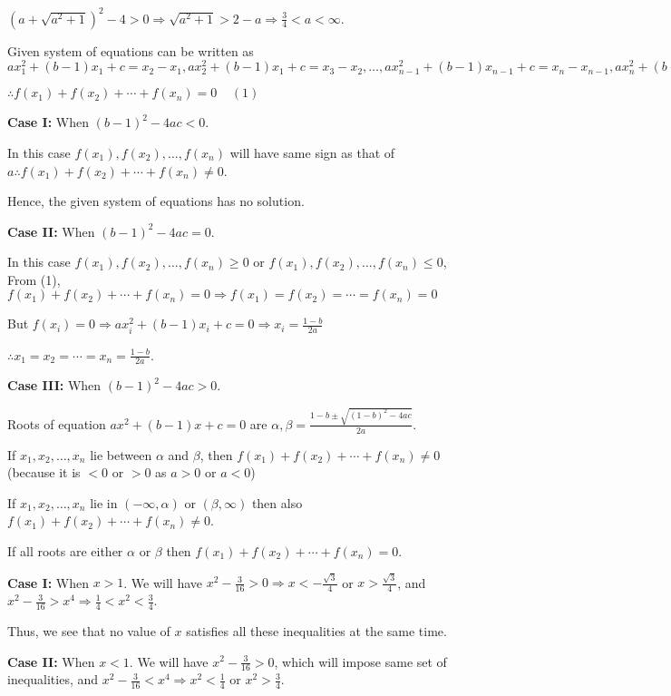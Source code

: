  $(a + \sqrt{a^2 + 1})^2 - 4 > 0 \Rightarrow \sqrt{a^2 + 1} > 2 - a \Rightarrow \frac{3}{4} < a < \infty$.
\item Given system of equations can be written as $ax_1^2 + (b - 1)x_1 + c = x_2 - x_1, ax_2^2 + (b - 1)x_1
  + c = x_3 - x_2, \ldots, ax_{n - 1}^2 + (b - 1)x_{n - 1} + c = x_n - x_{n - 1}, ax_n^2 + (b - 1)x_n + c =
  x_1 - x_n$

  $\therefore f(x_1) + f(x_2) + \cdots + f(x_n) = 0\;\;\;\;(1)$

  {\bf Case I:} When $(b - 1)^2 - 4ac < 0$.

  In this case $f(x_1), f(x_2), \ldots, f(x_n)$ will have same sign as that of $a\therefore f(x_1) + f(x_2)
  + \cdots + f(x_n)\neq 0$.

  Hence, the given system of equations has no solution.

  {\bf Case II:} When $(b - 1)^2 - 4ac = 0$.

  In this case $f(x_1), f(x_2), \ldots, f(x_n) \geq 0$ or $f(x_1), f(x_2), \ldots, f(x_n)\leq 0$, From (1),
  $f(x_1) + f(x_2) + \cdots + f(x_n) = 0 \Rightarrow f(x_1) = f(x_2) = \cdots = f(x_n) = 0$

  But $f(x_i) = 0 \Rightarrow ax_i^2 + (b - 1)x_i + c = 0 \Rightarrow x_i = \frac{1 - b}{2a}$

  $\therefore x_1 = x_2 = \cdots = x_n = \frac{1 - b}{2a}$.

  {\bf Case III:} When $(b - 1)^2 - 4ac > 0$.

  Roots of equation $ax^2 + (b - 1)x + c = 0$ are $\alpha,\beta = \frac{1 - b\pm\sqrt{(1 - b)^2 -
      4ac}}{2a}$.

  If $x_1, x_2, \ldots, x_n$ lie between $\alpha$ and $\beta$, then $f(x_1) + f(x_2) + \cdots + f(x_n)\neq
  0$ (because it is $< 0$ or $> 0$ as $a > 0$ or $a < 0$)

  If $x_1, x_2, \ldots, x_n$ lie in $(-\infty, \alpha)$ or $(\beta, \infty)$ then also $f(x_1) + f(x_2) +
  \cdots + f(x_n)\neq 0$.

  If all roots are either $\alpha$ or $\beta$ then $f(x_1) + f(x_2) + \cdots + f(x_n) = 0$.
\item {\bf Case I:} When $x > 1$. We will have $x^2 - \frac{3}{16} > 0 \Rightarrow x < -\frac{\sqrt{3}}{4}$
  or $x > \frac{\sqrt{3}}{4}$, and $x^2 - \frac{3}{16} > x^4 \Rightarrow \frac{1}{4} < x^2 < \frac{3}{4}$.

  Thus, we see that no value of $x$ satisfies all these inequalities at the same time.

  {\bf Case II:} When $x < 1$. We will have $x^2 - \frac{3}{16} > 0$, which will impose same set of
  inequalities, and $x^2 - \frac{3}{16} < x^4 \Rightarrow x^2 < \frac{1}{4}$ or $x^2 > \frac{3}{4}$.

